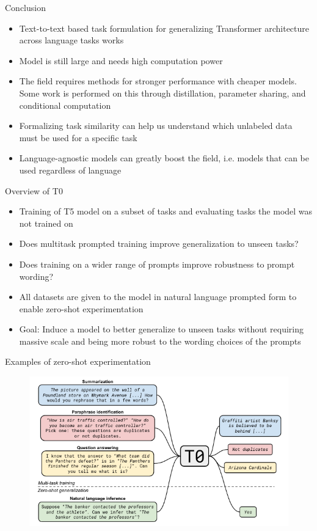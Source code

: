 \documentclass[english]{mlutalk}
\begin{document}
\begin{frame}{Conclusion}
    \begin{itemize}
      \item Text-to-text based task formulation for generalizing Transformer architecture across language tasks works
      \item Model is still large and needs high computation power
      \item The field requires methods for stronger performance with cheaper models. Some work is performed on this through distillation, parameter sharing, and conditional computation
      \item  Formalizing task similarity can help us understand which unlabeled data must be used for a specific task
      \item Language-agnostic models can greatly boost the field, i.e. models that can be used regardless of language
    \end{itemize}
\end{frame}

\begin{frame}{Overview of T0~\cite{SanhWRBSACSLRDBXTSSKCNDCJWMSYPBWNRSSFFTBGBWR2021}}
    \begin{itemize}
      \item Training of T5 model on a subset of tasks and evaluating tasks the model was not trained on
      \item Does multitask prompted training improve generalization to unseen tasks?
      \item Does training on a wider range of prompts improve robustness to prompt wording?
      \item All datasets are given to the model in natural language prompted form to enable zero-shot experimentation
      \item Goal: Induce a model to better generalize to unseen tasks without requiring massive scale and being more robust to the
      wording choices of the prompts
    \end{itemize}
\end{frame}

\begin{frame}{Examples of zero-shot experimentation}
    \begin{figure}
        \center
        \includegraphics[scale=0.45]{figures/t0_examples.png}
    \end{figure}
\end{frame}
\end{document}
